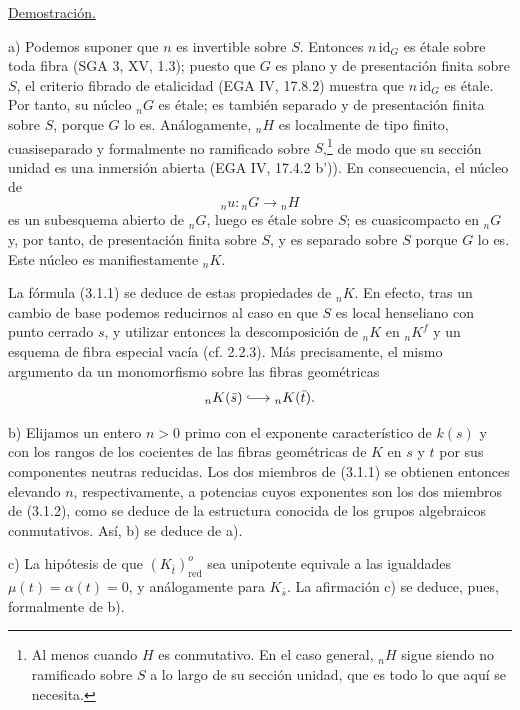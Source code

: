 \medskip
\noindent
\underline{Demostración.}

\smallskip
\noindent
a) Podemos suponer que $n$ es invertible sobre $S$. Entonces
$n\,\mathrm{id}_G$ es étale sobre toda fibra (SGA 3, XV, 1.3); puesto
que $G$ es plano y de presentación finita sobre $S$, el criterio
fibrado de etalicidad (EGA IV, 17.8.2) muestra que
$n\,\mathrm{id}_G$ es étale. Por tanto, su núcleo ${}_nG$ es étale;
es también separado y de presentación finita sobre $S$, porque $G$ lo
es. Análogamente, ${}_nH$ es localmente de tipo finito, cuasiseparado y
formalmente no ramificado sobre $S$,\footnote{Al menos cuando $H$ es
conmutativo. En el caso general, ${}_nH$ sigue siendo no ramificado
sobre $S$ a lo largo de su sección unidad, que es todo lo que aquí se
necesita.} de modo que su sección unidad es una inmersión abierta
(EGA IV, 17.4.2 b')). En consecuencia, el núcleo de
\[
 {}_nu:{}_nG\longrightarrow {}_nH
\]
es un subesquema abierto de ${}_nG$, luego es étale sobre $S$; es
cuasicompacto en ${}_nG$ y, por tanto, de presentación finita sobre
$S$, y es separado sobre $S$ porque $G$ lo es. Este núcleo es
manifiestamente ${}_nK$.

La fórmula (3.1.1) se deduce de estas propiedades de ${}_nK$. En efecto,
tras un cambio de base podemos reducirnos al caso en que $S$ es local
henseliano con punto cerrado $s$, y utilizar entonces la descomposición
de ${}_nK$ en ${}_nK^f$ y un esquema de fibra especial vacía
(cf. 2.2.3). Más precisamente, el mismo argumento da un monomorfismo
sobre las fibras geométricas
\[
 {}_nK(\bar s)\lhook\joinrel\longrightarrow {}_nK(\bar t).
\]

\smallskip
\noindent
b) Elijamos un entero $n>0$ primo con el exponente característico de
$k(s)$ y con los rangos de los cocientes de las fibras geométricas de
$K$ en $s$ y $t$ por sus componentes neutras reducidas. Los dos miembros
de (3.1.1) se obtienen entonces elevando $n$, respectivamente, a
potencias cuyos exponentes son los dos miembros de (3.1.2), como se
deduce de la estructura conocida de los grupos algebraicos conmutativos.
Así, b) se deduce de a).

\smallskip
\noindent
c) La hipótesis de que $(K_{\bar t})^o_{\mathrm{red}}$ sea unipotente
equivale a las igualdades $\mu(t)=\alpha(t)=0$, y análogamente para
$K_{\bar s}$. La afirmación c) se deduce, pues, formalmente de b).

